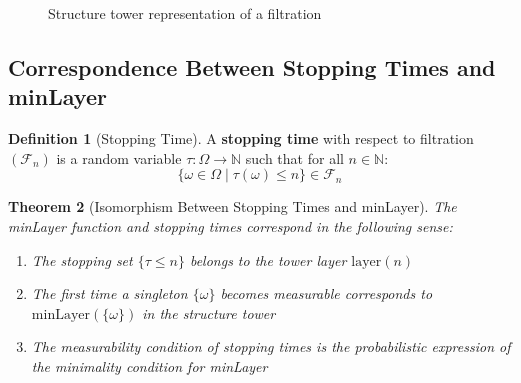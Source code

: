 \documentclass[11pt,a4paper]{article}
\theoremstyle{plain}
\newtheorem{theorem}{Theorem}[section]
\theoremstyle{definition}
\newtheorem{definition}[theorem]{Definition}
\newcommand{\NN}{\mathbb{N}}
\newcommand{\FF}{\mathcal{F}}
\newcommand{\minmark}{\mathrm{minLayer}}
\newcommand{\layer}{\mathrm{layer}}
\begin{document}
\begin{figure}[htbp]
\centering
{}
\caption{Structure tower representation of a filtration}
\label{fig:filtration-tower}
\end{figure}

\subsection{Correspondence Between Stopping Times and minLayer}

\begin{definition}[Stopping Time]
\label{def:stopping-time}
A \textbf{stopping time} with respect to filtration $(\FF_n)$ is a 
random variable $\tau : \Omega \to \NN$ such that for all $n \in \NN$:
\[
  \{\omega \in \Omega \mid \tau(\omega) \leq n\} \in \FF_n
\]
\end{definition}

\begin{theorem}[Isomorphism Between Stopping Times and minLayer]
\label{thm:stopping-minlayer}
The minLayer function and stopping times correspond in the following sense:
\begin{enumerate}[label=(\roman*)]
  \item The stopping set $\{\tau \leq n\}$ belongs to the tower layer $\layer(n)$
  \item The first time a singleton $\{\omega\}$ becomes measurable corresponds 
        to $\minmark(\{\omega\})$ in the structure tower
  \item The measurability condition of stopping times is the probabilistic 
        expression of the minimality condition for minLayer
\end{enumerate}
\end{theorem}
\end{document}
